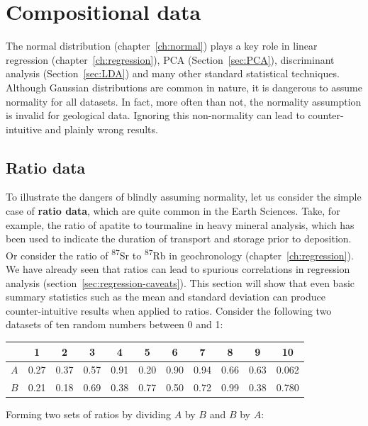 \chapter{Compositional data}
\label{ch:compositional}

The normal distribution (chapter~\ref{ch:normal}) plays a key role in
linear regression (chapter~\ref{ch:regression}), PCA
(Section~\ref{sec:PCA}), discriminant analysis (Section~\ref{sec:LDA})
and many other standard statistical techniques. Although Gaussian
distributions are common in nature, it is dangerous to assume
normality for all datasets. In fact, more often than not, the
normality assumption is invalid for geological data. Ignoring this
non-normality can lead to counter-intuitive and plainly wrong results.

\section{Ratio data}
\label{sec:ratios}

To illustrate the dangers of blindly assuming normality, let us
consider the simple case of \textbf{ratio data}, which are quite
common in the Earth Sciences.  Take, for example, the ratio of apatite
to tourmaline in heavy mineral analysis, which has been used to
indicate the duration of transport and storage prior to deposition.
Or consider the ratio of \textsuperscript{87}Sr to
\textsuperscript{87}Rb in geochronology (chapter~\ref{ch:regression}).
We have already seen that ratios can lead to spurious correlations in
regression analysis (section~\ref{sec:regression-caveats}).  This
section will show that even basic summary statistics such as the mean
and standard deviation can produce counter-intuitive results when
applied to ratios. Consider the following two datasets of ten random
numbers between 0 and 1:

\begin{center}
  \begin{tabular}{c|cccccccccc}
    & 1 & 2 & 3 & 4 & 5 & 6 & 7 & 8 & 9 & 10 \\ \hline
    $A$ & 0.27 & 0.37 & 0.57 & 0.91 & 0.20 & 0.90 & 0.94 & 0.66 & 0.63 & 0.062 \\
    $B$ & 0.21 & 0.18 & 0.69 & 0.38 & 0.77 & 0.50 & 0.72 & 0.99 & 0.38 & 0.780 
  \end{tabular}
\end{center}

Forming two sets of ratios by dividing $A$ by $B$ and $B$ by $A$:

